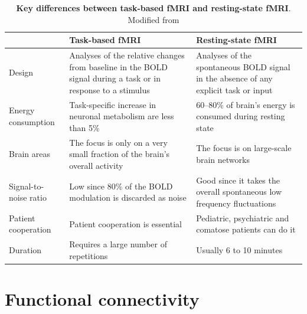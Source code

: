\begin{table}[htb]
    \centering
    \caption[Key differences between task-based fMRI and resting-state fMRI]{\textbf{Key differences between task-based fMRI and resting-state fMRI}. Modified from \citet{smitha_resting_2017}}
    \label{tab:method:fMRI-paradigm}
    \begin{tabularx}{\textwidth}{lXX}
    \toprule
                          & Task-based fMRI                                                                                                 & Resting-state fMRI                                                                   \\ \midrule
    Design                & Analyses of the relative changes from baseline in the BOLD signal during a task or in response to a stimulus    & Analyses of the spontaneous BOLD signal in the absence of any explicit task or input \\
    Energy consumption    & Task-specific increase in neuronal metabolism are less than 5\%                                                 & 60–80\% of brain’s energy is consumed during resting state                           \\
    Brain areas           & The focus is only on a very small fraction of the brain’s overall activity                                      & The focus is on large-scale brain networks                                           \\
    Signal-to-noise ratio & Low since 80\% of the BOLD modulation is discarded as noise                                                     & Good since it takes the overall spontaneous low frequency fluctuations               \\
    Patient cooperation   & Patient cooperation is essential                                                                                & Pediatric, psychiatric and comatose patients can do it                               \\
    Duration              & Requires a large number of repetitions                                                                          & Usually 6 to 10 minutes                                                              \\ \bottomrule
    \end{tabularx}%
\end{table}

\section{Functional connectivity}
\label{sec:fmri:fc}

